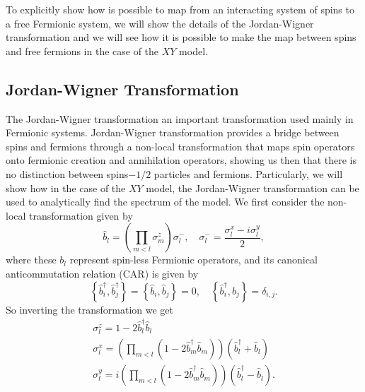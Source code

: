 \indent To explicitly show how is possible to map from an interacting system of spins to a free Fermionic system, we will show the details of the Jordan-Wigner transformation and we will see how it is possible to make the map between spins and free fermions in the case of the $XY$ model.
\subsection{Jordan-Wigner Transformation}

The Jordan-Wigner transformation an important transformation used mainly in Fermionic systems. Jordan-Wigner transformation provides a bridge between spins and fermions through a non-local transformation that maps spin operators onto fermionic creation and annihilation operators, showing us then that there is no distinction between spins$-1/2$ particles and fermions\cite{Michael_nielsen_2005}. Particularly, we will show how in the case of the $XY$ model, the Jordan-Wigner transformation can be used to analytically find the spectrum of the model. We first consider the non-local transformation given by
\begin{equation}
\hat{b}_{l}=\left(\prod_{m<l} \sigma_{m}^{z}\right) \sigma_{l}^{-}, \quad \sigma_{l}^{-}=\frac{\sigma_{l}^{x}-i \sigma_{l}^{y}}{2},
\end{equation}
where these $b_l$ represent spin-less Fermionic operators, and its canonical anticommutation relation (CAR) is given by\cite{reyes-lega_aspects_2016} 
\begin{equation}
\left\{\hat{b}_{i}^{\dagger}, \hat{b}_{j}^{\dagger}\right\}=\left\{\hat{b}_{i}, \hat{b}_{j}\right\}=0, \quad\left\{\hat{b}_{i}^{\dagger}, \hat{b}_{j}\right\}=\delta_{i, j}.
\end{equation}
So inverting the transformation we get 
\begin{equation}
\begin{array}{l}
\sigma_{l}^{z}=1-2 \hat{b}_{l}^{\dagger} \hat{b}_{l} \\
\sigma_{l}^{x}=\left(\prod_{m<l}\left(1-2 \hat{b}_{m}^{\dagger} \hat{b}_{m}\right)\right)\left(\hat{b}_{l}^{\dagger}+\hat{b}_{l}\right) \\
\sigma_{l}^{y}=i\left(\prod_{m<l}\left(1-2 \hat{b}_{m}^{\dagger} \hat{b}_{m}\right)\right)\left(\hat{b}_{l}^{\dagger}-\hat{b}_{l}\right).
\end{array}
\end{equation}

